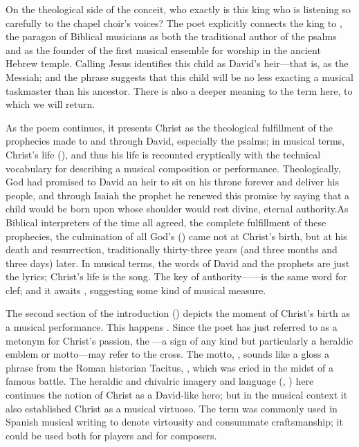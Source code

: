 On the theological side of the conceit, who exactly is this king who is
listening so carefully to the chapel choir's voices?
The poet explicitly connects the king to , the paragon
of Biblical musicians as both the traditional author of the psalms and as the
founder of the first musical ensemble for worship in the ancient Hebrew
temple.\citXXX
Calling Jesus  identifies this child as David's
heir---that is, as the Messiah; and the phrase  suggests that this child will be no less exacting a musical taskmaster
than his ancestor.
There is also a deeper meaning to the term  here, to which we will
return.

As the poem continues, it presents Christ as the theological fulfillment of the
prophecies made to and through David, especially the psalms; in musical terms,
Christ's life  (), and thus
his life is recounted cryptically with the technical vocabulary for describing a
musical composition or performance.
Theologically, God had promised to David an heir to sit on his throne forever
and deliver his people,
and through Isaiah the prophet he renewed this promise by saying that a child
would be born upon whose shoulder would rest divine, eternal
authority.
As Biblical interpreters of the time all agreed, the complete fulfillment of
these prophecies, the culmination of all God's  () came not at Christ's birth, but at his death and
resurrection, traditionally thirty-three years (and three months and three days)
later.\citXXX
In musical terms, the words of David and the prophets are just the lyrics;
Christ's life is the song.
The key of authority------is the same word for clef; and it
awaits , suggesting some kind of musical measure.

The second section of the introduction () depicts the moment of
Christ's birth as a musical performance. 
This happens . 
Since the poet has just referred to  as a metonym for
Christ's passion, the ---a sign of any kind but particularly a
heraldic emblem or motto---may refer to the cross.\citXXX
The motto, , sounds like a gloss a phrase
from the Roman historian Tacitus, , which was cried in
the midst of a famous battle.\citXXX %
The heraldic and chivalric imagery and language (,
) here continues the notion of Christ as a
David-like hero; but in the musical context it also established Christ as a
musical virtuoso.
The term  was commonly used in Spanish musical writing to
denote virtousity and consummate craftsmanship; it could be used both for
players and for composers.\citXXX

